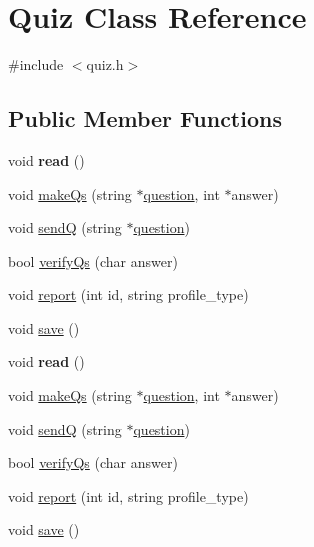 \hypertarget{class_quiz}{}\section{Quiz Class Reference}
\label{class_quiz}


{\ttfamily \#include $<$quiz.\+h$>$}

\subsection*{Public Member Functions}
\begin{DoxyCompactItemize}
\item 
\hypertarget{class_quiz_a585d5f112cbf72932fff7983c1e5b2c9}{}void {\bfseries read} ()\label{class_quiz_a585d5f112cbf72932fff7983c1e5b2c9}

\item 
void \hyperlink{class_quiz_a318cf3e77db0c2a994752ef0541792bf}{make\+Qs} (string $\ast$\hyperlink{class_quiz_a8d26a1bec061915e1095808386fa64f6}{question}, int $\ast$answer)
\item 
void \hyperlink{class_quiz_a31824f4cb143442fb30d05d5193e6e90}{send\+Q} (string $\ast$\hyperlink{class_quiz_a8d26a1bec061915e1095808386fa64f6}{question})
\item 
bool \hyperlink{class_quiz_a04872049618df0469f083b226f68eb16}{verify\+Qs} (char answer)
\item 
void \hyperlink{class_quiz_aefcae0c2187864f7764e3a2cc536f723}{report} (int id, string profile\+\_\+type)
\item 
void \hyperlink{class_quiz_a2a30f1d27f8a873dedbf4a19c4143f31}{save} ()
\item 
\hypertarget{class_quiz_a585d5f112cbf72932fff7983c1e5b2c9}{}void {\bfseries read} ()\label{class_quiz_a585d5f112cbf72932fff7983c1e5b2c9}

\item 
void \hyperlink{class_quiz_a318cf3e77db0c2a994752ef0541792bf}{make\+Qs} (string $\ast$\hyperlink{class_quiz_a8d26a1bec061915e1095808386fa64f6}{question}, int $\ast$answer)
\item 
void \hyperlink{class_quiz_a31824f4cb143442fb30d05d5193e6e90}{send\+Q} (string $\ast$\hyperlink{class_quiz_a8d26a1bec061915e1095808386fa64f6}{question})
\item 
bool \hyperlink{class_quiz_a04872049618df0469f083b226f68eb16}{verify\+Qs} (char answer)
\item 
void \hyperlink{class_quiz_aefcae0c2187864f7764e3a2cc536f723}{report} (int id, string profile\+\_\+type)
\item 
void \hyperlink{class_quiz_a2a30f1d27f8a873dedbf4a19c4143f31}{save} ()
\end{DoxyCompactItemize}
